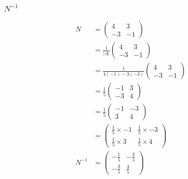 \documentclass{article}
\begin{document}
\subsubsection{$N^{-1}$}
\begin{align*}
	N  &=
	\begin{pmatrix}
		4 & 3\\
		-3 & -1
	\end{pmatrix}
	\\
	&= \frac{1}{|A|}
	\begin{pmatrix}
		4 & 3\\
		-3 & -1
	\end{pmatrix}
	\\
	&= \frac{1}{4(-1) - 3(-3)}
	\begin{pmatrix}
		4 & 3\\
		-3 & -1
	\end{pmatrix}
	\\
	&= \frac{1}{5}
	\begin{pmatrix}
		-1 & 3\\
		-3 & 4
	\end{pmatrix}
	\\
	&= \frac{1}{5}
	\begin{pmatrix}
		-1 & -3\\
	 	3 & 4
	\end{pmatrix}
	\\
	&=
	\begin{pmatrix}
		\frac{1}{5}\times-1 & \frac{1}{5}\times-3\\
		\frac{1}{5}\times3 & \frac{1}{5}\times4
	\end{pmatrix}
	\\
	N^{-1}&=
	\begin{pmatrix}
		-\frac{1}{5} & -\frac{3}{5}\\
		-\frac{3}{5} & \frac{4}{5}
	\end{pmatrix}
\end{align*}
\end{document}

